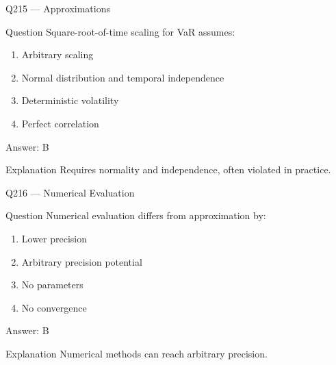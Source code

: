 \documentclass[aspectratio=169,8pt]{beamer}
\begin{document}
								\begin{frame}{Q215 --- Approximations}
									\begin{block}{Question}
										Square-root-of-time scaling for VaR assumes:
										\begin{enumerate}
											\item Arbitrary scaling
											\item Normal distribution and temporal independence
											\item Deterministic volatility
											\item Perfect correlation
										\end{enumerate}
									\end{block}
									\begin{exampleblock}{Answer: B}\end{exampleblock}
									\begin{block}{Explanation}
										Requires normality and independence, often violated in practice.
									\end{block}
								\end{frame}
								
								\begin{frame}{Q216 --- Numerical Evaluation}
									\begin{block}{Question}
										Numerical evaluation differs from approximation by:
										\begin{enumerate}
											\item Lower precision
											\item Arbitrary precision potential
											\item No parameters
											\item No convergence
										\end{enumerate}
									\end{block}
									\begin{exampleblock}{Answer: B}\end{exampleblock}
									\begin{block}{Explanation}
										Numerical methods can reach arbitrary precision.
									\end{block}
								\end{frame}
								
\end{document}
